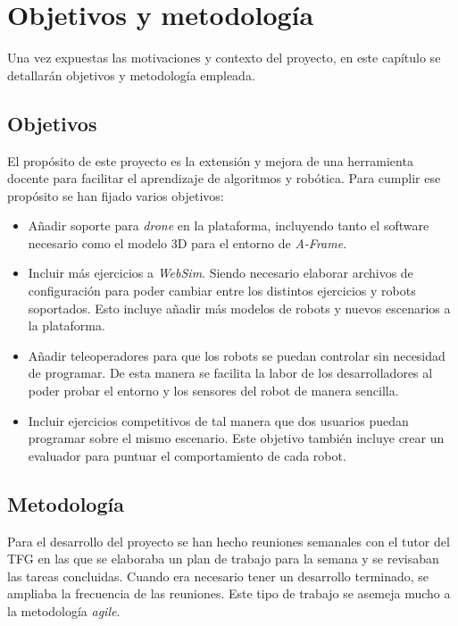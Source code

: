 \chapter{Objetivos y metodología}
Una vez expuestas las motivaciones y contexto del proyecto, en este capítulo se detallarán objetivos y metodología empleada. 

\label{chap:objetivos}
\section{Objetivos}
El propósito de este proyecto es la extensión y mejora de una herramienta docente para facilitar el aprendizaje de algoritmos y robótica. Para cumplir ese propósito se han fijado varios objetivos:
\begin{itemize}
    \item Añadir soporte para \textit{drone} en la plataforma, incluyendo tanto el software necesario como el modelo 3D para el entorno de \textit{A-Frame}.
    
    \item Incluir más ejercicios a \textit{WebSim}. Siendo necesario elaborar archivos de configuración para poder cambiar entre los distintos ejercicios y robots soportados. Esto incluye añadir más modelos de robots y nuevos escenarios a la plataforma.
    
    \item Añadir teleoperadores para que los robots se puedan controlar sin necesidad de programar. De esta manera se facilita la labor de los desarrolladores al poder probar el entorno y los sensores del robot de manera sencilla.
    
    \item Incluir ejercicios competitivos de tal manera que dos usuarios puedan programar sobre el mismo escenario. Este objetivo también incluye crear un evaluador para puntuar el comportamiento de cada robot. 
    
\end{itemize}
\section{Metodología}
\label{sec:metodologia}

Para el desarrollo del proyecto se han hecho reuniones semanales con el tutor del TFG en las que se elaboraba un plan de trabajo para la semana y se revisaban las tareas concluidas. Cuando era necesario tener un desarrollo terminado, se ampliaba la frecuencia de las reuniones. Este tipo de trabajo se asemeja mucho a la metodología \textit{agile}. \newline

